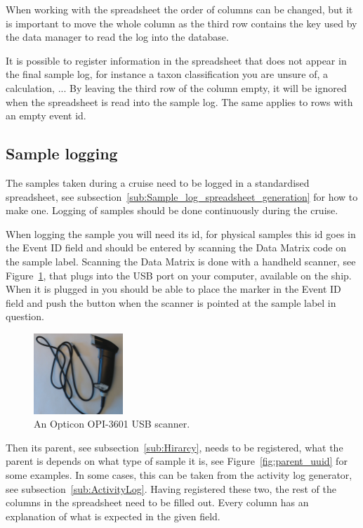 \documentclass[a4paper,english, 11pt]{article}
\begin{document}
When working with the spreadsheet the order of columns can be changed, but it is important to move the whole column as the third row contains the key used by the data manager to read the log into the database. 

It is possible to register information in the spreadsheet that does not appear in the final sample log, for instance a taxon classification you are unsure of, a calculation, ... By leaving the third row of the column empty, it will be ignored when the spreadsheet is read into the sample log. The same applies to rows with an empty event id.



\subsection{Sample logging} %
\label{sub:spreadsheet_reg}


The samples taken during a cruise need to be logged in a standardised spreadsheet, see subsection~\ref{sub:Sample_log_spreadsheet_generation} for how to make one. Logging of samples should be done continuously during the cruise. 

When logging the sample you will need its id, for physical samples this id goes in the Event ID field and should be entered by scanning the Data Matrix code on the sample label. Scanning the Data Matrix is done with a handheld scanner, see Figure~\ref{fig:scanner}, that plugs into the USB port on your computer, available on the ship. When it is plugged in you should be able to place the marker in the Event ID field and push the button when the scanner is pointed at the sample label in question. 


\begin{figure}[h!tb]
    \centering
    \includegraphics[width=0.3\textwidth]{Scanner.jpg}
    \caption{\label{fig:scanner}
        An Opticon OPI-3601 USB scanner.
    }
\end{figure}


Then its parent, see subsection~\ref{sub:Hirarcy}, needs to be registered, what the parent is depends on what type of sample it is, see Figure~\ref{fig:parent_uuid} for some examples. In some cases, this can be taken from the activity log generator, see subsection~\ref{sub:ActivityLog}. Having registered these two, the rest of the columns in the spreadsheet need to be filled out. Every column has an explanation of what is expected in the given field. 
\end{document}

